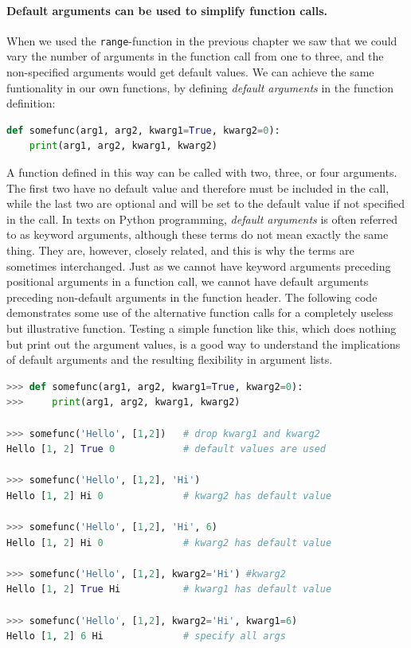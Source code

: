 \documentclass[graybox,envcountchap,sectrefs,final]{svmonodo}
\begin{document}
\paragraph{Default arguments can be used to simplify function calls.}
When we used the \texttt{range}-function in the previous chapter we saw that we could vary the number of arguments in the
function call from one to three, and the non-specified arguments would get default values. We can achieve the same
funtionality in our own functions, by defining \emph{default arguments} in the function definition:
\begin{lstlisting}[language=Python,style=blue1]
def somefunc(arg1, arg2, kwarg1=True, kwarg2=0):
    print(arg1, arg2, kwarg1, kwarg2)
\end{lstlisting}
A function defined in this way can be called with two, three, or four arguments. The first two have no default value and
therefore must be included in the call, while the last two are optional and will be set to the default value if not
specified in the call. In texts on Python programming, \emph{default arguments} is often  referred to as keyword arguments, although
these terms do not mean exactly the same thing. They are, however, closely related, and this is why the terms are sometimes
interchanged. Just as we cannot have keyword arguments preceding positional arguments in a function call, we cannot have
default arguments preceding non-default arguments in the function header.
The following code demonstrates some use of the alternative function calls
for a completely useless but illustrative
function. Testing a simple function like this, which does nothing but print out the argument values, is a good
way to understand the implications of default arguments and the resulting flexibility in argument lists.
\begin{lstlisting}[language=Python,style=blue1]
>>> def somefunc(arg1, arg2, kwarg1=True, kwarg2=0):
>>>     print(arg1, arg2, kwarg1, kwarg2)

>>> somefunc('Hello', [1,2])   # drop kwarg1 and kwarg2
Hello [1, 2] True 0            # default values are used

>>> somefunc('Hello', [1,2], 'Hi')
Hello [1, 2] Hi 0              # kwarg2 has default value

>>> somefunc('Hello', [1,2], 'Hi', 6)
Hello [1, 2] Hi 0              # kwarg2 has default value

>>> somefunc('Hello', [1,2], kwarg2='Hi') #kwarg2
Hello [1, 2] True Hi           # kwarg1 has default value

>>> somefunc('Hello', [1,2], kwarg2='Hi', kwarg1=6)
Hello [1, 2] 6 Hi              # specify all args
\end{lstlisting}
\end{document}
